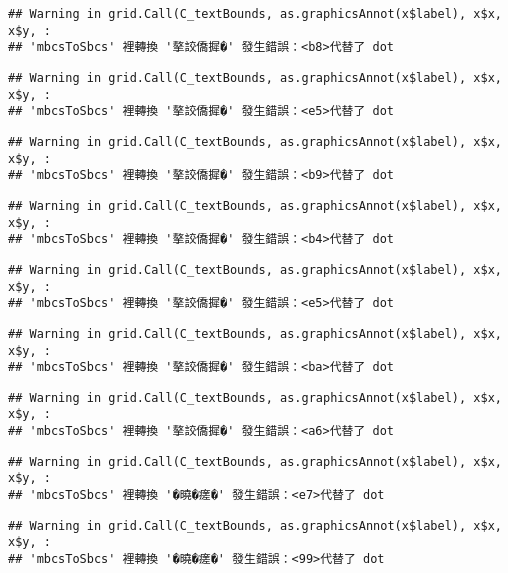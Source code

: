 \documentclass[
]{article}
\begin{document}
\begin{verbatim}
## Warning in grid.Call(C_textBounds, as.graphicsAnnot(x$label), x$x, x$y, :
## 'mbcsToSbcs' 裡轉換 '摮詨僑摨�' 發生錯誤：<b8>代替了 dot
\end{verbatim}

\begin{verbatim}
## Warning in grid.Call(C_textBounds, as.graphicsAnnot(x$label), x$x, x$y, :
## 'mbcsToSbcs' 裡轉換 '摮詨僑摨�' 發生錯誤：<e5>代替了 dot
\end{verbatim}

\begin{verbatim}
## Warning in grid.Call(C_textBounds, as.graphicsAnnot(x$label), x$x, x$y, :
## 'mbcsToSbcs' 裡轉換 '摮詨僑摨�' 發生錯誤：<b9>代替了 dot
\end{verbatim}

\begin{verbatim}
## Warning in grid.Call(C_textBounds, as.graphicsAnnot(x$label), x$x, x$y, :
## 'mbcsToSbcs' 裡轉換 '摮詨僑摨�' 發生錯誤：<b4>代替了 dot
\end{verbatim}

\begin{verbatim}
## Warning in grid.Call(C_textBounds, as.graphicsAnnot(x$label), x$x, x$y, :
## 'mbcsToSbcs' 裡轉換 '摮詨僑摨�' 發生錯誤：<e5>代替了 dot
\end{verbatim}

\begin{verbatim}
## Warning in grid.Call(C_textBounds, as.graphicsAnnot(x$label), x$x, x$y, :
## 'mbcsToSbcs' 裡轉換 '摮詨僑摨�' 發生錯誤：<ba>代替了 dot
\end{verbatim}

\begin{verbatim}
## Warning in grid.Call(C_textBounds, as.graphicsAnnot(x$label), x$x, x$y, :
## 'mbcsToSbcs' 裡轉換 '摮詨僑摨�' 發生錯誤：<a6>代替了 dot
\end{verbatim}

\begin{verbatim}
## Warning in grid.Call(C_textBounds, as.graphicsAnnot(x$label), x$x, x$y, :
## 'mbcsToSbcs' 裡轉換 '�曉�瘥�' 發生錯誤：<e7>代替了 dot
\end{verbatim}

\begin{verbatim}
## Warning in grid.Call(C_textBounds, as.graphicsAnnot(x$label), x$x, x$y, :
## 'mbcsToSbcs' 裡轉換 '�曉�瘥�' 發生錯誤：<99>代替了 dot
\end{verbatim}
\end{document}
